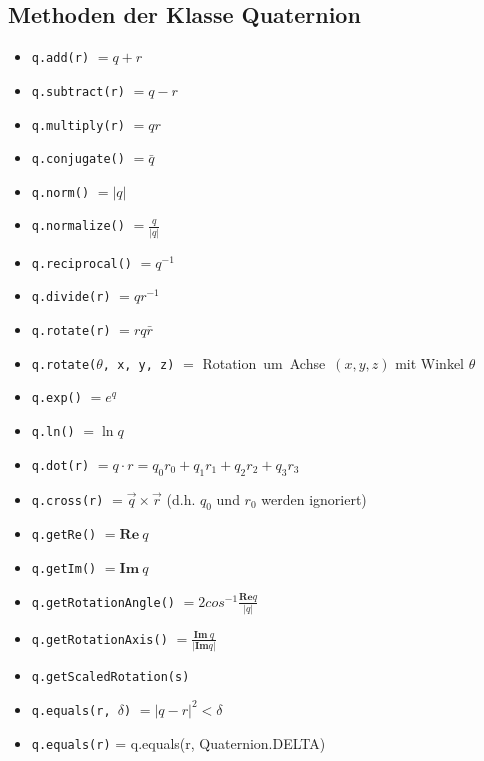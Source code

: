 \documentclass[12pt]{article}
\begin{document}
  \subsection{Methoden der Klasse Quaternion}
  \begin{itemize}
    \item \texttt{q.add(r)} $= q + r$
    \item \texttt{q.subtract(r)} $= q - r$
    \item \texttt{q.multiply(r)} $= q r$
    \item \texttt{q.conjugate()} $= \bar{q}$
    \item \texttt{q.norm()} $= \lvert q \rvert$
    \item \texttt{q.normalize()} $= \frac{q}{\lvert q \rvert}$
    \item \texttt{q.reciprocal()} $= q^{-1}$
    \item \texttt{q.divide(r)} $= q r^{-1}$
    \item \texttt{q.rotate(r)} $= r q \bar{r}$
    \item \texttt{q.rotate($\theta$, x, y, z)} $=$ Rotation\ um\ Achse\ $(x, y, z)$ mit Winkel $\theta$
    \item \texttt{q.exp()} $= e^q$
    \item \texttt{q.ln()} $= \ln q$
    \item \texttt{q.dot(r)} $= q \cdot r = q_0 r_0 + q_1 r_1 + q_2 r_2 + q_3 r_3$
    \item \texttt{q.cross(r)} $= \vec{q} \times \vec{r}$ (d.h. $q_0$ und $r_0$ werden ignoriert)
    \item \texttt{q.getRe()} $= \mathbf{Re}\ q$
    \item \texttt{q.getIm()} $= \mathbf{Im}\ q$
    \item \texttt{q.getRotationAngle()} $= 2 cos^{-1}\frac{\mathbf{Re} q}{\lvert q \rvert}$
    \item \texttt{q.getRotationAxis()} $= \frac{\mathbf{Im}\ q}{\lvert \mathbf{Im} q \rvert}$
    \item \texttt{q.getScaledRotation(s)}
    \item \texttt{q.equals(r, $\delta$)} $= |q - r|^2 < \delta$
    \item \texttt{q.equals(r)} = q.equals(r, Quaternion.DELTA)
  \end{itemize}
\end{document}

